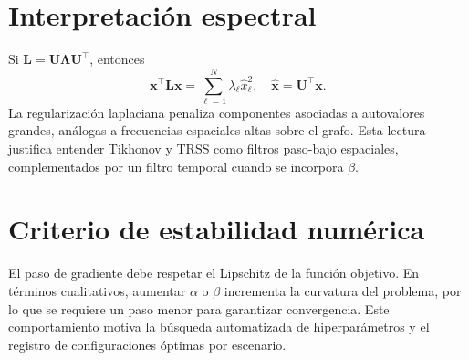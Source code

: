 \section{Interpretación espectral}
Si $\mathbf{L}=\mathbf{U}\mathbf{\Lambda}\mathbf{U}^{\top}$, entonces
\begin{equation}
\mathbf{x}^{\top}\mathbf{L}\mathbf{x}=\sum_{\ell=1}^{N}\lambda_{\ell}\hat{x}_{\ell}^{2}, \quad \hat{\mathbf{x}}=\mathbf{U}^{\top}\mathbf{x}.
\end{equation}
La regularización laplaciana penaliza componentes asociadas a autovalores grandes, análogas a frecuencias espaciales altas sobre el grafo. Esta lectura justifica entender Tikhonov y TRSS como filtros paso-bajo espaciales, complementados por un filtro temporal cuando se incorpora $\beta$.

\section{Criterio de estabilidad numérica}
El paso de gradiente debe respetar el Lipschitz de la función objetivo. En términos cualitativos, aumentar $\alpha$ o $\beta$ incrementa la curvatura del problema, por lo que se requiere un paso menor para garantizar convergencia. Este comportamiento motiva la búsqueda automatizada de hiperparámetros y el registro de configuraciones óptimas por escenario.
